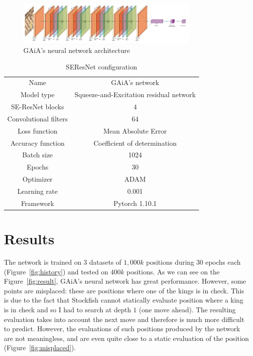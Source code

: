 \documentclass[unnumsec,webpdf,contemporary,large]{Article}%
\theoremstyle{thmstyleone}%
\theoremstyle{thmstyletwo}%
\theoremstyle{thmstylethree}%
\begin{document}
\begin{figure}[H]
  \centering
  \includegraphics[width=9cm]{network/network.pdf}
  \caption{GAiA's neural network architecture}
  \label{fig:model_archi}
\end{figure}

\begin{table}[H]
  \centering
  \begin{tabular}{c c}
    \hline
    Name & GAiA's network\\
    Model type & Squeeze-and-Excitation residual network\\
    \hline
    SE-ResNet blocks & 4\\
    Convolutional filters & 64\\
    Loss function & Mean Absolute Error\\
    Accuracy function & Coefficient of determination\\
    Batch size & 1024\\
    Epochs & 30\\
    Optimizer & ADAM\\
    Learning rate & 0.001\\
    Framework & Pytorch 1.10.1\\
    \hline
  \end{tabular}
  \caption{SEResNet configuration}
  \label{table:config}
\end{table}

\section{Results}

The network is trained on 3 datasets of $1,000k$ positions during 30 epochs each
(Figure~\ref{fig:history}) and tested on $400k$ positions.
As we can see on the Figure~\ref{fig:result}, GAiA's neural network
has great performance.
However, some points are misplaced: these are positions where one of the kings is
in check. This is due to the fact that Stockfish cannot statically evaluate
position where a king is in check and so I had to search at depth $1$ (one move ahead).
The resulting evaluation takes into account the next move and therefore
is much more difficult to predict. However, the evaluations of
such positions produced by the network are not meaningless,
and are even quite close to a static evaluation of the position
(Figure~\ref{fig:misplaced}).
\end{document}
